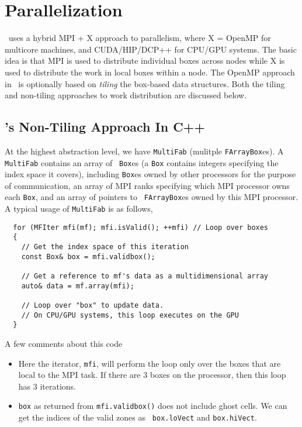\section{Parallelization}
\label{sec:parallel}

\amrex\ uses a hybrid MPI + X approach to parallelism,
where  X = OpenMP for multicore machines, and CUDA/HIP/DCP++ for CPU/GPU systems.
The basic idea is that MPI is used to distribute individual boxes across
nodes while X is used to distribute the work in local boxes
within a node.  The OpenMP approach in \amrex\ is optionally
based on {\em tiling} the box-based data structures.  Both the tiling and
non-tiling approaches to work distribution are discussed below.

\subsection{\amrex's Non-Tiling Approach In C++}
\label{sec:amrex0}

At the highest abstraction level, we have {\tt MultiFab} (mulitple
{\tt FArrayBox}es).  A {\tt MultiFab} contains an array of {\tt
  Box}es (a {\tt Box} contains integers specifying the index space it
covers), including {\tt Box}es owned by other processors for the
purpose of communication, an array of MPI ranks specifying which MPI
processor owns each {\tt Box}, and an array of pointers to {\tt
  FArrayBox}es owned by this MPI processor.
A typical usage of {\tt MultiFab} is as follows,

\begin{lstlisting}
  for (MFIter mfi(mf); mfi.isValid(); ++mfi) // Loop over boxes
  {
    // Get the index space of this iteration
    const Box& box = mfi.validbox(); 

    // Get a reference to mf's data as a multidimensional array 
    auto& data = mf.array(mfi);

    // Loop over "box" to update data.
    // On CPU/GPU systems, this loop executes on the GPU
  }
\end{lstlisting}
A few comments about this code
\begin{itemize}
\item Here the iterator, {\tt mfi}, will perform the loop only over the
   boxes that are local to the MPI task.  If there are 3 boxes on the
   processor, then this loop has 3 iterations.
      
\item {\tt box} as returned from {\tt mfi.validbox()} does not include
   ghost cells.  We can get the indices of the valid zones as {\tt
   box.loVect} and {\tt box.hiVect}.
\end{itemize}


